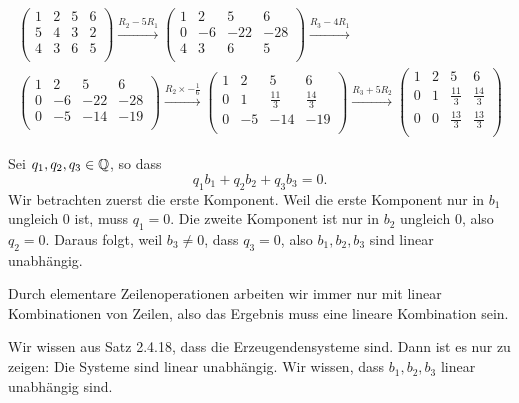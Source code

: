 \begin{parts}
\item 
	\begin{gather*}
	\left(
\begin{array}{cccc}
 1 & 2 & 5 & 6 \\
 5 & 4 & 3 & 2 \\
 4 & 3 & 6 & 5 \\
\end{array}
\right) \xrightarrow{R_2-5R_1} \left(
\begin{array}{cccc}
 1 & 2 & 5 & 6 \\
 0 & -6 & -22 & -28 \\
 4 & 3 & 6 & 5 \\
\end{array}
\right) \xrightarrow{R_3-4R_1}\\ \left(
\begin{array}{cccc}
 1 & 2 & 5 & 6 \\
 0 & -6 & -22 & -28 \\
 0 & -5 & -14 & -19 \\
\end{array}
\right) \xrightarrow{R_2\times -\frac{1}{6}} \left(
\begin{array}{cccc}
 1 & 2 & 5 & 6 \\
 0 & 1 & \frac{11}{3} & \frac{14}{3} \\
 0 & -5 & -14 & -19 \\
\end{array}
\right) \xrightarrow{R_3+5R_2} \left(
\begin{array}{cccc}
 1 & 2 & 5 & 6 \\
 0 & 1 & \frac{11}{3} & \frac{14}{3} \\
 0 & 0 & \frac{13}{3} & \frac{13}{3} \\
\end{array}
\right)	
	\end{gather*}
\item Sei $q_1,q_2,q_3\in \mathbb{Q}$, so dass
	\[
	q_1b_1+q_2b_2+q_3b_3=0
	.\] 
	Wir betrachten zuerst die erste Komponent. Weil die erste Komponent nur in $b_1$ ungleich $0$ ist, muss $q_1=0$. Die zweite Komponent ist nur in $b_2$ ungleich $0$, also $q_2=0$. Daraus folgt, weil $b_3\neq 0$, dass $q_3=0$, also $b_1,b_2,b_3$ sind linear unabhängig.
\item Durch elementare Zeilenoperationen arbeiten wir immer nur mit linear Kombinationen von Zeilen, also das Ergebnis muss eine lineare Kombination sein.
\item Wir wissen aus Satz 2.4.18, dass die Erzeugendensysteme sind. Dann ist es nur zu zeigen: Die Systeme sind linear unabhängig. Wir wissen, dass $b_1,b_2,b_3$ linear unabhängig sind. 


\end{parts}
